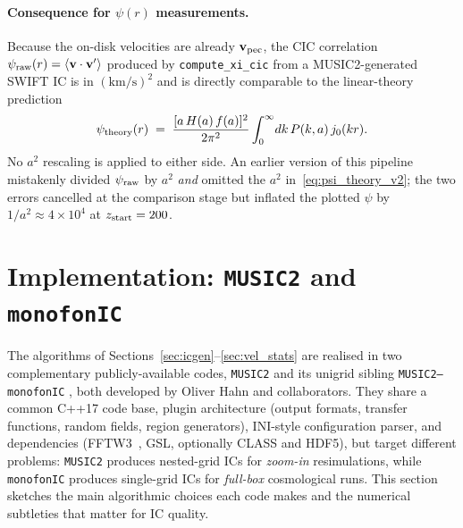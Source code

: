 \documentclass[12pt]{article}
\newcommand{\bv}{\mathbf{v}}
\begin{document}
\paragraph{Consequence for $\psi(r)$ measurements.}
Because the on-disk velocities are already $\bv_{\rm pec}$, the CIC
correlation
$\psi_{\rm raw}(r) = \langle\bv\cdot\bv'\rangle$ produced by
\texttt{compute\_xi\_cic} from a MUSIC2-generated SWIFT IC is in
$\mathrm{(km/s)^2}$ and is directly comparable to the linear-theory
prediction
%
\begin{equation}
  \psi_{\rm theory}(r) \;=\; \frac{[a\,H(a)\,f(a)]^2}{2\pi^2}
        \int_0^\infty\!dk\, P(k,a)\, j_0(kr).
  \label{eq:psi_theory_v2}
\end{equation}
%
No $a^2$ rescaling is applied to either side.  An earlier version of
this pipeline mistakenly divided $\psi_{\rm raw}$ by $a^2$ \emph{and}
omitted the $a^2$ in~\eqref{eq:psi_theory_v2}; the two errors
cancelled at the comparison stage but inflated the plotted
$\psi$ by $1/a^2 \approx 4\times10^4$ at $z_{\rm start}=200$.

\section{Implementation: \texttt{MUSIC2} and \texttt{monofonIC}}
\label{sec:implementations}

The algorithms of Sections~\ref{sec:icgen}--\ref{sec:vel_stats} are
realised in two complementary publicly-available codes,
\texttt{MUSIC2} \citep{Hahn2011} and its unigrid sibling
\texttt{MUSIC2--monofonIC} \citep{Michaux2020,HahnRampfUhlemann2021},
both developed by Oliver Hahn and collaborators.  They share a
common C++17 code base, plugin architecture (output formats,
transfer functions, random fields, region generators), INI-style
configuration parser, and dependencies
(FFTW3~\citep{Frigo2005}, GSL, optionally CLASS and HDF5), but target
different problems: \texttt{MUSIC2} produces nested-grid ICs for
\emph{zoom-in} resimulations, while \texttt{monofonIC} produces
single-grid ICs for \emph{full-box} cosmological runs.  This section
sketches the main algorithmic choices each code makes and the
numerical subtleties that matter for IC quality.
\end{document}
